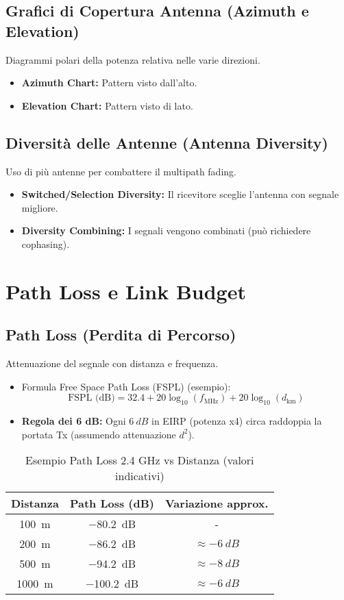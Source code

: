 \subsection{Grafici di Copertura Antenna (Azimuth e Elevation)}
Diagrammi polari della potenza relativa nelle varie direzioni.
\begin{itemize}
    \item \textbf{Azimuth Chart:} Pattern visto dall'alto.
    \item \textbf{Elevation Chart:} Pattern visto di lato.
\end{itemize}

\subsection{Diversità delle Antenne (Antenna Diversity)}
Uso di più antenne per combattere il multipath fading.
\begin{itemize}
    \item \textbf{Switched/Selection Diversity:} Il ricevitore sceglie l'antenna con segnale migliore.
    \item \textbf{Diversity Combining:} I segnali vengono combinati (può richiedere cophasing).
\end{itemize}

\section{Path Loss e Link Budget}

\subsection{Path Loss (Perdita di Percorso)}
Attenuazione del segnale con distanza e frequenza.
\begin{itemize}
    \item Formula Free Space Path Loss (FSPL) (esempio):
    \[ \text{FSPL (dB)} = 32.4 + 20 \log_{10}(f_{\text{MHz}}) + 20 \log_{10}(d_{\text{km}}) \]
    \item \textbf{Regola dei 6 dB:} Ogni $\SI{+6}{dB}$ in EIRP (potenza x4) circa raddoppia la portata Tx (assumendo attenuazione $d^2$).
\end{itemize}
\begin{table}[H]
\centering
\caption{Esempio Path Loss 2.4 GHz vs Distanza (valori indicativi)}
\begin{tabular}{|c|c|c|}
\hline
\textbf{Distanza} & \textbf{Path Loss (dB)} & \textbf{Variazione approx.} \\ \hline
\SI{100}{\meter} & \SI{-80.2}{dB} & - \\ \hline
\SI{200}{\meter} & \SI{-86.2}{dB} & $\approx \SI{-6}{dB}$ \\ \hline
\SI{500}{\meter} & \SI{-94.2}{dB} & $\approx \SI{-8}{dB}$ \\ \hline
\SI{1000}{\meter} & \SI{-100.2}{dB} & $\approx \SI{-6}{dB}$ \\ \hline
\end{tabular}
\label{tab:path_loss}
\end{table}

